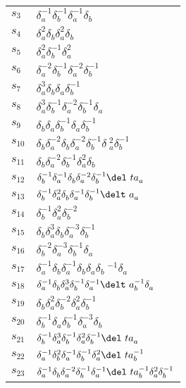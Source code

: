 \documentclass{article}
\begin{document}
\begin{center}
\begin{tabular}{ll}
$s_{3}$ & $\delta_a^{-1}\delta_b^{-1}\delta_a^{-1}\delta_b^{}$ \\
$s_{4}$ & $\delta_a^{2}\delta_b^{}\delta_a^{2}\delta_b^{}$ \\
$s_{5}$ & $\delta_a^{2}\delta_b^{-1}\delta_a^{2}$ \\
$s_{6}$ & $\delta_a^{-2}\delta_b^{-1}\delta_a^{-2}\delta_b^{-1}$ \\
$s_{7}$ & $\delta_a^{3}\delta_b^{}\delta_a^{}\delta_b^{-1}$ \\
$s_{8}$ & $\delta_a^{3}\delta_b^{-1}\delta_a^{-2}\delta_b^{-1}\delta_a^{}$ \\
$s_{9}$ & $\delta_b^{}\delta_a^{}\delta_b^{-1}\delta_a^{}\delta_b^{-1}$ \\
$s_{10}$ & $\delta_b^{}\delta_a^{-2}\delta_b^{}\delta_a^{-2}\delta_b^{-1}\delta\
_a^{2}\delta_b^{-1}$ \\
$s_{11}$ & $\delta_b^{}\delta_a^{-2}\delta_b^{-1}\delta_a^{2}\delta_b^{}$ \\
$s_{12}$ & $\delta_b^{-1}\delta_a^{-1}\delta_b^{}\delta_a^{-2}\delta_b^{-1}\del\
ta_a^{}$ \\
$s_{13}$ & $\delta_b^{-1}\delta_a^{2}\delta_b^{}\delta_a^{-1}\delta_b^{-1}\delt\
a_a^{}$ \\
$s_{14}$ & $\delta_b^{-1}\delta_a^{2}\delta_b^{-2}$ \\
$s_{15}$ & $\delta_b^{}\delta_a^{3}\delta_b^{}\delta_a^{-3}\delta_b^{-1}$ \\
$s_{16}$ & $\delta_b^{-2}\delta_a^{-3}\delta_b^{-1}\delta_a^{}$ \\
$s_{17}$ & $\delta_a^{-1}\delta_b^{}\delta_a^{-1}\delta_b^{}\delta_a^{}\delta_b\
^{-1}\delta_a^{}$ \\
$s_{18}$ & $\delta_a^{-1}\delta_b^{}\delta_a^{3}\delta_b^{-1}\delta_a^{-1}\delt\
a_b^{-1}\delta_a^{}$ \\
$s_{19}$ & $\delta_b^{}\delta_a^{2}\delta_b^{-2}\delta_a^{2}\delta_b^{-1}$ \\
$s_{20}$ & $\delta_b^{-1}\delta_a^{}\delta_b^{-1}\delta_a^{-3}\delta_b^{}$ \\
$s_{21}$ & $\delta_b^{-1}\delta_a^{3}\delta_b^{-1}\delta_a^{2}\delta_b^{-1}\del\
ta_a^{}$ \\
$s_{22}$ & $\delta_a^{-1}\delta_b^{2}\delta_a^{-1}\delta_b^{-1}\delta_a^{2}\del\
ta_b^{-1}$ \\
$s_{23}$ & $\delta_a^{-1}\delta_b^{}\delta_a^{-2}\delta_b^{-1}\delta_a^{-1}\del\
ta_b^{-1}\delta_a^{2}\delta_b^{-1}$ \\
\bottomrule
\end{tabular}
\end{center}

\thispagestyle{empty}
\end{document}
